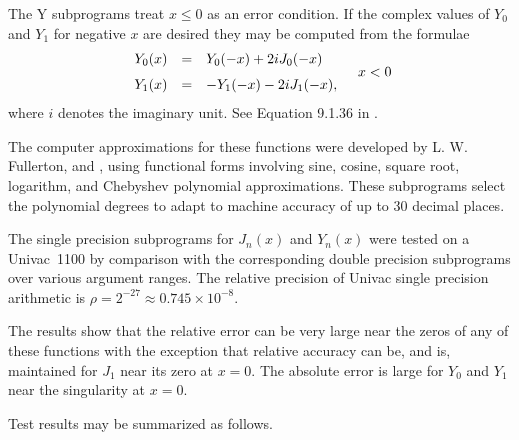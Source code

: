 \documentclass[twoside]{MATH77}
\begin{document}
The Y subprograms treat $x\leq 0$ as an error condition. If the complex values
of $Y_0$ and $Y_1$ for negative $x$ are desired they may be computed from
the formulae
\begin{equation}
\begin{array}{ll}
\begin{array}{rcl}
Y_0(x) & = & Y_0(-x)+2iJ_0(-x)
\rule[-10pt]{0pt}{8pt} \\ Y_1(x) & = & -Y_1(-x)-2iJ_1(-x),
\end{array}
\quad x<0
\end{array}\notag
\end{equation}
where $i$ denotes the imaginary unit. See Equation 9.1.36 in \cite{ams55}.

The computer approximations for these functions were developed by L. W.
Fullerton, \cite{Fullerton:1973:FNLIB} and \cite{Fullerton:1977:PSF},
using functional forms involving sine, cosine, square root, logarithm, and
Chebyshev polynomial approximations.  These subprograms select the
polynomial degrees to adapt to machine accuracy of up to 30 decimal
places.

The single precision subprograms for $J_n(x)$ and $Y_n(x)$ were tested on a
Univac~1100 by comparison with the corresponding double precision
subprograms over various argument ranges. The relative precision of Univac
single precision arithmetic is $\rho = 2^{-27} \approx 0.745\times 10^{-8}$.

The results show that the relative error can be very large near the zeros
of any of these functions with the exception that relative accuracy can be,
and is, maintained for $J_1$ near its zero at $x = 0$. The absolute error
is large for $Y_0$ and $Y_1$ near the singularity at $x = 0.$

Test results may be summarized as follows.
\end{document}
